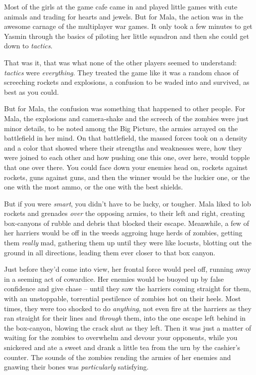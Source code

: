 Most of the girls at the game cafe came in and played little games
with cute animals and trading for hearts and jewels. But for Mala,
the action was in the awesome carnage of the multiplayer war games.
It only took a few minutes to get Yasmin through the basics of
piloting her little squadron and then she could get down to
\emph{tactics}.

That was it, that was what none of the other players seemed to
understand: \emph{tactics} were \emph{everything}. They treated the
game like it was a random chaos of screeching rockets and
explosions, a confusion to be waded into and survived, as best as
you could.

But for Mala, the confusion was something that happened to other
people. For Mala, the explosions and camera-shake and the screech
of the zombies were just minor details, to be noted among the Big
Picture, the armies arrayed on the battlefield in her mind. On that
battlefield, the massed forces took on a density and a color that
showed where their strengths and weaknesses were, how they were
joined to each other and how pushing one this one, over here, would
topple that one over there. You could face down your enemies head
on, rockets against rockets, guns against guns, and then the winner
would be the luckier one, or the one with the most ammo, or the one
with the best shields.

But if you were \emph{smart}, you didn't have to be lucky, or
tougher. Mala liked to lob rockets and grenades \emph{over} the
opposing armies, to their left and right, creating box-canyons of
rubble and debris that blocked their escape. Meanwhile, a few of
her harriers would be off in the weeds aggroing huge herds of
zombies, getting them \emph{really} mad, gathering them up until
they were like locusts, blotting out the ground in all directions,
leading them ever closer to that box canyon.

Just before they'd come into view, her frontal force would peel
off, running away in a seeming act of cowardice. Her enemies would
be buoyed up by false confidence and give chase -- until they saw
the harriers coming straight for them, with an unstoppable,
torrential pestilence of zombies hot on their heels. Most times,
they were too shocked to do \emph{anything}, not even fire at the
harriers as they ran straight for their lines and \emph{through}
them, into the one escape left behind in the box-canyon, blowing
the crack shut as they left. Then it was just a matter of waiting
for the zombies to overwhelm and devour your opponents, while you
snickered and ate a sweet and drank a little tea from the urn by
the cashier's counter. The sounds of the zombies rending the armies
of her enemies and gnawing their bones was \emph{particularly}
satisfying.

